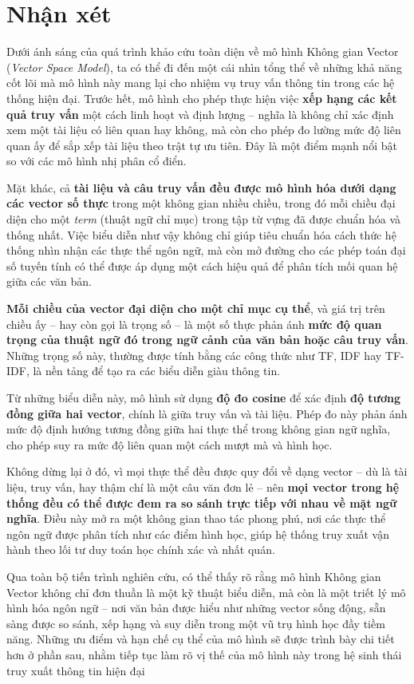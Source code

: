 \section{Nhận xét}
Dưới ánh sáng của quá trình khảo cứu toàn diện về mô hình Không gian Vector (\textit{Vector Space Model}), ta có thể đi đến một cái nhìn tổng thể về những khả năng cốt lõi mà mô hình này mang lại cho nhiệm vụ truy vấn thông tin trong các hệ thống hiện đại. Trước hết, mô hình cho phép thực hiện việc \textbf{xếp hạng các kết quả truy vấn} một cách linh hoạt và định lượng -- nghĩa là không chỉ xác định xem một tài liệu có liên quan hay không, mà còn cho phép đo lường mức độ liên quan ấy để sắp xếp tài liệu theo trật tự ưu tiên. Đây là một điểm mạnh nổi bật so với các mô hình nhị phân cổ điển.

Mặt khác, cả \textbf{tài liệu và câu truy vấn đều được mô hình hóa dưới dạng các vector số thực} trong một không gian nhiều chiều, trong đó mỗi chiều đại diện cho một \textit{term} (thuật ngữ chỉ mục) trong tập từ vựng đã được chuẩn hóa và thống nhất. Việc biểu diễn như vậy không chỉ giúp tiêu chuẩn hóa cách thức hệ thống nhìn nhận các thực thể ngôn ngữ, mà còn mở đường cho các phép toán đại số tuyến tính có thể được áp dụng một cách hiệu quả để phân tích mối quan hệ giữa các văn bản.

\textbf{Mỗi chiều của vector đại diện cho một chỉ mục cụ thể}, và giá trị trên chiều ấy -- hay còn gọi là trọng số -- là một số thực phản ánh \textbf{mức độ quan trọng của thuật ngữ đó trong ngữ cảnh của văn bản hoặc câu truy vấn}. Những trọng số này, thường được tính bằng các công thức như TF, IDF hay TF-IDF, là nền tảng để tạo ra các biểu diễn giàu thông tin.

Từ những biểu diễn này, mô hình sử dụng \textbf{độ đo cosine} để xác định \textbf{độ tương đồng giữa hai vector}, chính là giữa truy vấn và tài liệu. Phép đo này phản ánh mức độ định hướng tương đồng giữa hai thực thể trong không gian ngữ nghĩa, cho phép suy ra mức độ liên quan một cách mượt mà và hình học.

Không dừng lại ở đó, vì mọi thực thể đều được quy đổi về dạng vector -- dù là tài liệu, truy vấn, hay thậm chí là một câu văn đơn lẻ -- nên \textbf{mọi vector trong hệ thống đều có thể được đem ra so sánh trực tiếp với nhau về mặt ngữ nghĩa}. Điều này mở ra một không gian thao tác phong phú, nơi các thực thể ngôn ngữ được phân tích như các điểm hình học, giúp hệ thống truy xuất vận hành theo lối tư duy toán học chính xác và nhất quán.

Qua toàn bộ tiến trình nghiên cứu, có thể thấy rõ rằng mô hình Không gian Vector không chỉ đơn thuần là một kỹ thuật biểu diễn, mà còn là một triết lý mô hình hóa ngôn ngữ -- nơi văn bản được hiểu như những vector sống động, sẵn sàng được so sánh, xếp hạng và suy diễn trong một vũ trụ hình học đầy tiềm năng. Những ưu điểm và hạn chế cụ thể của mô hình sẽ được trình bày chi tiết hơn ở phần sau, nhằm tiếp tục làm rõ vị thế của mô hình này trong hệ sinh thái truy xuất thông tin hiện đại


